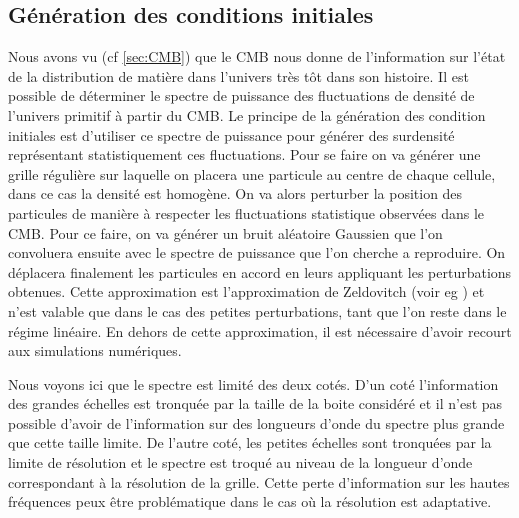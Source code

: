 \subsection{Génération des conditions initiales}
\label{sec:IC}
Nous avons vu (cf \ref{sec:CMB}) que le \ac{CMB} nous donne de l'information sur l'état de la distribution de matière dans l'univers très tôt dans son histoire.
Il est possible de déterminer le spectre de puissance des fluctuations de densité de l'univers primitif à partir du \ac{CMB}.
Le principe de la génération des condition initiales est d'utiliser ce spectre de puissance pour générer des surdensité représentant statistiquement ces fluctuations.
Pour se faire on va générer une grille régulière sur laquelle on placera une particule au centre de chaque cellule, dans ce cas la densité est homogène.
On va alors perturber la position des particules de manière à respecter les fluctuations statistique observées dans le \ac{CMB}.
Pour ce faire, on va générer un bruit aléatoire Gaussien que l'on 
convoluera ensuite avec le spectre de puissance que l'on cherche a reproduire.
On déplacera finalement les particules en accord en leurs appliquant les perturbations obtenues. 
Cette approximation est l’approximation de Zeldovitch (voir eg \cite{2014MNRAS.439.3630W}) et n'est valable que dans le cas des petites perturbations, tant que l'on reste dans le régime linéaire.
En dehors de cette approximation, il est nécessaire d'avoir recourt aux simulations numériques.

Nous voyons ici que le spectre est limité des deux cotés.
D'un coté l'information des grandes échelles est tronquée par la taille de la boite considéré et il n'est pas possible d'avoir de l’information sur des longueurs d'onde du spectre plus grande que cette taille limite.
De l'autre coté, les petites échelles sont tronquées par la limite de résolution et le spectre est troqué au niveau de la longueur d'onde correspondant à la résolution de la grille.
Cette perte d'information sur les hautes fréquences peux être problématique dans le cas où la résolution est adaptative.

